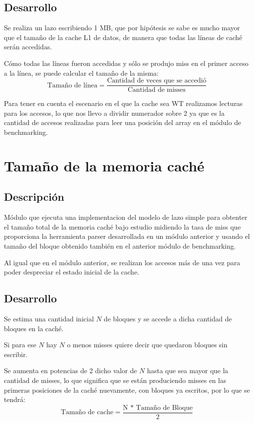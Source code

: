 \documentclass[a4paper,10pt]{article}
\begin{document}
\subsection{Desarrollo}
Se realiza un lazo escribiendo 1 MB, que por hipótesis se sabe es mucho mayor que el tamaño de la cache L1 de datos, de manera que todas las líneas de caché serán accedidas.
\par
Cómo todas las líneas fueron accedidas y sólo se produjo miss en el primer acceso a la línea, se puede calcular el tamaño de la misma:  
\[ \text{Tamaño de línea}
  = \dfrac{\text{Cantidad de veces que se accedió}}{\text{Cantidad de misses}}
\]

Para tener en cuenta el escenario en el que la cache sea WT realizamos lecturas para los accesos, lo que nos llevo a dividir numerador sobre 2 ya que es la cantidad de accesos realizadas para leer una posición del array en el módulo de benchmarking.
 
\section{Tamaño de la memoria caché}
\subsection{Descripción}
Módulo que ejecuta una implementacion del modelo de lazo
simple para obtenter el tamaño total de la memoria caché bajo estudio midiendo
la tasa de miss que proporciona la herramienta parser desarrollada
en un módulo anterior y usando el tamaño del bloque obtenido también en el anterior módulo de benchmarking.

Al igual que en el módulo anterior, se realizan los accesos más de una vez para poder despreciar el estado inicial de la cache.
\subsection{Desarrollo}
Se estima una cantidad inicial $N$ de bloques y se accede a dicha cantidad de bloques en la caché.
\par
Si para ese $N$ hay $N$ o menos misses quiere decir que quedaron bloques sin escribir.

Se aumenta en potencias de 2 dicho valor de $N$ hasta que sea mayor que la cantidad de misses, lo que significa que se están produciendo misses en las primeras posiciones de la caché nuevamente, con bloques ya escritos, por lo que se tendrá:
\[ \text{Tamaño de cache}
  = \dfrac{\text{N * Tamaño de Bloque}}{\text{2}}
\]
\end{document}
